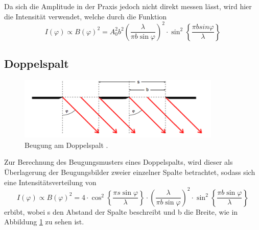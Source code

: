 Da sich die Amplitude in der Praxis jedoch nicht direkt messen lässt, wird hier
die Intensität verwendet, welche durch die Funktion
\begin{equation}
  I(\varphi) \propto B(\varphi)^2 = A_0^2b^2\left(\frac{\lambda}{\pi b \sin{\varphi}}\right)^2
  \cdot \sin^2\left\{{\frac{\pi b sin{\varphi}}{\lambda}}\right\}
  \label{eqn:int1}
\end{equation}
\subsection{Doppelspalt}
\begin{figure}[H]
  \centering
  \includegraphics[height=3cm]{Doppel.png}
  \caption{Beugung am Doppelspalt \cite{skript}.}
  \label{fig:doppel}
\end{figure}
Zur Berechnung des Beugungsmusters eines Doppelspalts, wird dieser als
Überlagerung der Beugungsbilder zweier einzelner Spalte betrachtet, sodass
sich eine Intensitätsverteilung von
\begin{equation}
  I(\varphi) \propto B(\varphi)^2 =4 \cdot \cos^2\left\{{\frac{\pi s \sin{\varphi}}{\lambda}}\right\}
  \cdot \left(\frac{\lambda}{\pi b \sin{\varphi}}\right)^2 \cdot \sin^2\left\{{\frac{\pi
  b \sin{\varphi}}{\lambda}}\right\}
\end{equation}
erbibt, wobei s den Abstand der Spalte beschreibt und b die Breite, wie in Abbildung
\ref{fig:doppel} zu sehen ist.
